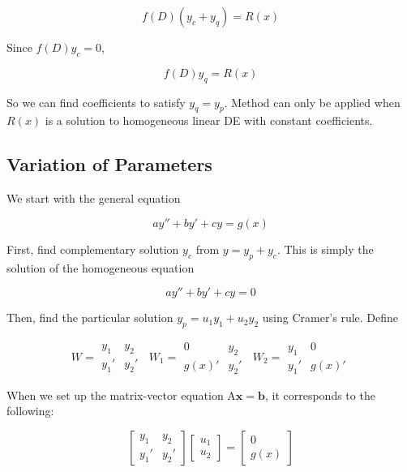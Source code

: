 \begin{equation}
    f(D)(y_c+y_q)=R(x)
\end{equation}

Since $f(D)y_c=0$,

\begin{equation}
    f(D)y_q=R(x)
\end{equation}

So we can find coefficients to satisfy $y_q=y_p$.
Method can only be applied when $R(x)$ is a solution to homogeneous linear DE with constant coefficients.

\subsection{Variation of Parameters}

We start with the general equation

\begin{equation}
    ay''+by'+cy=g(x)
\end{equation}

First, find complementary solution $y_c$ from $y=y_p+y_c$. This is simply the solution of the homogeneous equation

\begin{equation}
    ay''+by'+cy=0
\end{equation}

Then, find the particular solution $y_p=u_1y_1+u_2y_2$ using Cramer's rule. Define 

\begin{equation}
W=
\begin{array}{|cc|}
    y_1&y_2\\
    y_1'&y_2'
\end{array}\;\;
W_1=\begin{array}{|cc|}
    0&y_2\\
    g(x)'&y_2'
\end{array}\;\;
W_2=\begin{array}{|cc|}
    y_1&0\\
    y_1'&g(x)'
\end{array}
\end{equation}

When we set up the matrix-vector equation $\mathrm{A}\mathbf{x}=\mathbf{b}$, it corresponds to the following:

\begin{equation}
    \begin{bmatrix}
        y_1 & y_2\\
        y_1' & y_2'
    \end{bmatrix}
    \begin{bmatrix}
        u_1\\u_2
    \end{bmatrix}
    =\begin{bmatrix}
        0\\g(x)
    \end{bmatrix}
\end{equation}

